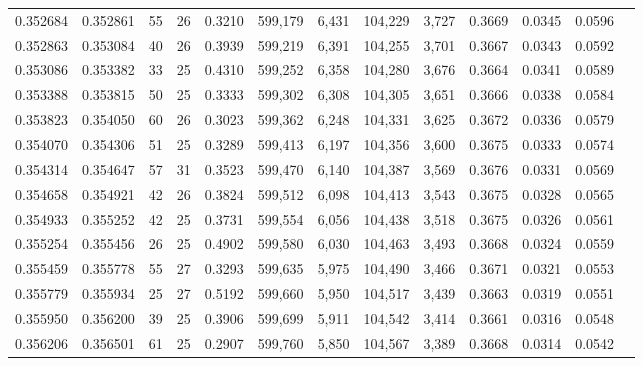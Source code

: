 \begin{tabular}{rrrrrrrrrrrrr}
0.352684 & 0.352861 &  55 &  26 &                                     0.3210 & 599,179 &   6,431 & 104,229 &   3,727 & 0.3669 & 0.0345 & 0.0596 \\
0.352863 & 0.353084 &  40 &  26 &                                     0.3939 & 599,219 &   6,391 & 104,255 &   3,701 & 0.3667 & 0.0343 & 0.0592 \\
0.353086 & 0.353382 &  33 &  25 &                                     0.4310 & 599,252 &   6,358 & 104,280 &   3,676 & 0.3664 & 0.0341 & 0.0589 \\
0.353388 & 0.353815 &  50 &  25 &                                     0.3333 & 599,302 &   6,308 & 104,305 &   3,651 & 0.3666 & 0.0338 & 0.0584 \\
0.353823 & 0.354050 &  60 &  26 &                                     0.3023 & 599,362 &   6,248 & 104,331 &   3,625 & 0.3672 & 0.0336 & 0.0579 \\
0.354070 & 0.354306 &  51 &  25 &                                     0.3289 & 599,413 &   6,197 & 104,356 &   3,600 & 0.3675 & 0.0333 & 0.0574 \\
0.354314 & 0.354647 &  57 &  31 &                                     0.3523 & 599,470 &   6,140 & 104,387 &   3,569 & 0.3676 & 0.0331 & 0.0569 \\
0.354658 & 0.354921 &  42 &  26 &                                     0.3824 & 599,512 &   6,098 & 104,413 &   3,543 & 0.3675 & 0.0328 & 0.0565 \\
0.354933 & 0.355252 &  42 &  25 &                                     0.3731 & 599,554 &   6,056 & 104,438 &   3,518 & 0.3675 & 0.0326 & 0.0561 \\
0.355254 & 0.355456 &  26 &  25 &                                     0.4902 & 599,580 &   6,030 & 104,463 &   3,493 & 0.3668 & 0.0324 & 0.0559 \\
0.355459 & 0.355778 &  55 &  27 &                                     0.3293 & 599,635 &   5,975 & 104,490 &   3,466 & 0.3671 & 0.0321 & 0.0553 \\
0.355779 & 0.355934 &  25 &  27 &                                     0.5192 & 599,660 &   5,950 & 104,517 &   3,439 & 0.3663 & 0.0319 & 0.0551 \\
0.355950 & 0.356200 &  39 &  25 &                                     0.3906 & 599,699 &   5,911 & 104,542 &   3,414 & 0.3661 & 0.0316 & 0.0548 \\
0.356206 & 0.356501 &  61 &  25 &                                     0.2907 & 599,760 &   5,850 & 104,567 &   3,389 & 0.3668 & 0.0314 & 0.0542 \\

\end{tabular}
